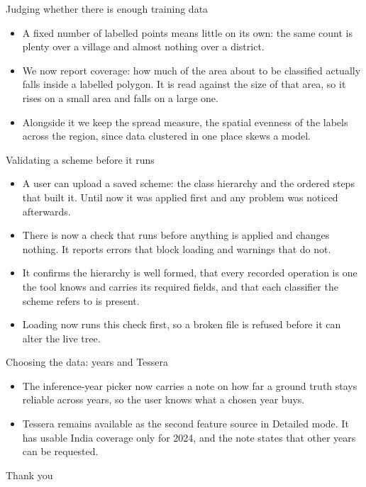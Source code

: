 \documentclass[aspectratio=169]{beamer}
\begin{document}
\begin{frame}{Judging whether there is enough training data}
\begin{itemize}
  \item A fixed number of labelled points means little on its own: the same count is plenty over
  a village and almost nothing over a district.
  \item We now report coverage: how much of the area about to be classified actually falls inside
  a labelled polygon. It is read against the size of that area, so it rises on a small area and
  falls on a large one.
  \item Alongside it we keep the spread measure, the spatial evenness of the labels across the
  region, since data clustered in one place skews a model.
\end{itemize}
\end{frame}

\begin{frame}{Validating a scheme before it runs}
\begin{itemize}
  \item A user can upload a saved scheme: the class hierarchy and the ordered steps that built
  it. Until now it was applied first and any problem was noticed afterwards.
  \item There is now a check that runs before anything is applied and changes nothing. It reports
  errors that block loading and warnings that do not.
  \item It confirms the hierarchy is well formed, that every recorded operation is one the tool
  knows and carries its required fields, and that each classifier the scheme refers to is present.
  \item Loading now runs this check first, so a broken file is refused before it can alter the
  live tree.
\end{itemize}
\end{frame}

\begin{frame}{Choosing the data: years and Tessera}
\begin{itemize}
  \item The inference-year picker now carries a note on how far a ground truth stays reliable
  across years, so the user knows what a chosen year buys.
  \item Tessera remains available as the second feature source in Detailed mode. It has usable
  India coverage only for 2024, and the note states that other years can be requested.
\end{itemize}
\end{frame}

\begin{frame}
\centering
\Large Thank you
\end{frame}
\end{document}
